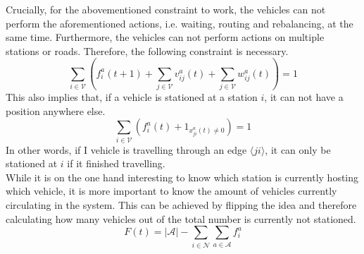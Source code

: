
Crucially, for the abovementioned constraint to work, the vehicles can not perform the aforementioned actions, i.e. waiting, routing and rebalancing, at the same time. Furthermore, the vehicles can not perform actions on multiple stations or roads. Therefore, the following constraint is necessary. \\
\begin{equation}
	\sum_{i \in \mathcal{V}}(f^a_{i}(t+1)+\sum_{j \in \mathcal{V}}v^a_{ij}(t) + \sum_{j \in \mathcal{V}}w^a_{ij}(t)) = 1\label{eq:no_3_actions}
\end{equation}
This also implies that, if a vehicle is stationed at a station $i$, it can not have a position anywhere else. 
\begin{equation}
	\sum_{i \in \mathcal{V}}(f^a_{i}(t)+1_{ x^a_{ji}(t)\neq 0}) =1 \label{eq:position_station}
\end{equation}
In other words, if I vehicle is travelling through an edge $\langle ji\rangle$, it can only be stationed at $i$ if it finished travelling. \\
While it is on the one hand interesting to know which station is currently hosting which vehicle, it is more important to know the amount of vehicles currently circulating in the system. This can be achieved by flipping the idea and therefore calculating how many vehicles out of the total number is currently not stationed. 
\begin{equation}
	F(t) = |\mathcal{A}| - \sum_{i \in\mathcal{N}}\sum_{a \in\mathcal{A}}f^a_{i}
\end{equation}



